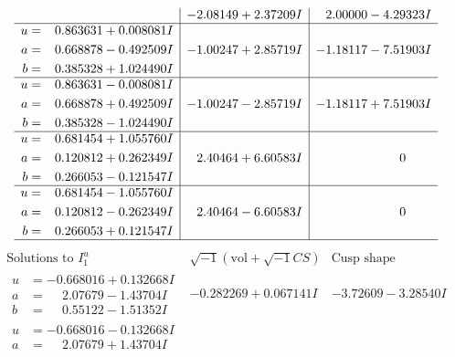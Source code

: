 \documentclass[1p]{elsarticle_modified}
\theoremstyle{definition}
\newcommand{\I}{\sqrt{-1}}
\begin{document}
$$\begin{array}{c|c|c}
 & -2.08149 + 2.37209 I & \phantom{-}2.00000 - 4.29323 I \\ \hline\begin{aligned}
u &= \phantom{-}0.863631 + 0.008081 I \\
a &= \phantom{-}0.668878 - 0.492509 I \\
b &= \phantom{-}0.385328 + 1.024490 I\end{aligned}
 & -1.00247 + 2.85719 I & -1.18117 - 7.51903 I \\ \hline\begin{aligned}
u &= \phantom{-}0.863631 - 0.008081 I \\
a &= \phantom{-}0.668878 + 0.492509 I \\
b &= \phantom{-}0.385328 - 1.024490 I\end{aligned}
 & -1.00247 - 2.85719 I & -1.18117 + 7.51903 I \\ \hline\begin{aligned}
u &= \phantom{-}0.681454 + 1.055760 I \\
a &= \phantom{-}0.120812 + 0.262349 I \\
b &= \phantom{-}0.266053 - 0.121547 I\end{aligned}
 & \phantom{-}2.40464 + 6.60583 I & \phantom{-0.000000 } 0 \\ \hline\begin{aligned}
u &= \phantom{-}0.681454 - 1.055760 I \\
a &= \phantom{-}0.120812 - 0.262349 I \\
b &= \phantom{-}0.266053 + 0.121547 I\end{aligned}
 & \phantom{-}2.40464 - 6.60583 I & \phantom{-0.000000 } 0\\
 \hline 
 \end{array}$$\newpage$$\begin{array}{c|c|c}  
\text{Solutions to }I^u_{1}& \I (\text{vol} + \sqrt{-1}CS) & \text{Cusp shape}\\
 \hline 
\begin{aligned}
u &= -0.668016 + 0.132668 I \\
a &= \phantom{-}2.07679 - 1.43704 I \\
b &= \phantom{-}0.55122 - 1.51352 I\end{aligned}
 & -0.282269 + 0.067141 I & -3.72609 - 3.28540 I \\ \hline\begin{aligned}
u &= -0.668016 - 0.132668 I \\
a &= \phantom{-}2.07679 + 1.43704 I \\

\end{aligned}
\end{array}$$
\end{document}

